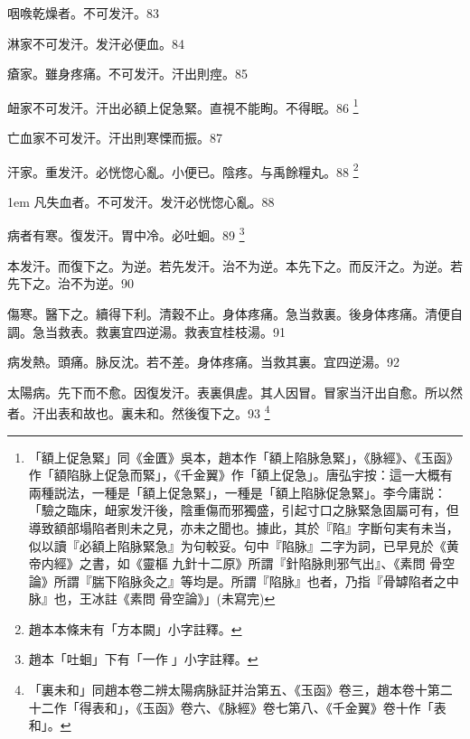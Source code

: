 咽㗋乾燥者。不可发汗。83

淋家不可发汗。发汗必便血。84

瘡家。雖身疼痛。不可发汗。汗出則痙。85

衄家不可发汗。汗出必額上促急緊。直視不能眴。不得眠。86
	\footnote{
		「額上促急緊」同《金匱》吳本，趙本作「額上陷脉急緊」，《脉經》、《玉函》作「額陷脉上促急而緊」，《千金翼》作「額上促急」。唐弘宇按：這一大概有兩種説法，一種是「額上促急緊」，一種是「額上陷脉促急緊」。李今庸説：「驗之臨床，衄家发汗後，陰重傷而邪獨盛，引起寸口之脉緊急固屬可有，但導致額部塌陷者則未之見，亦未之聞也。據此，其於『陷』字斷句実有未当，似以讀『必額上陷脉緊急』为句較妥。句中『陷脉』二字为詞，已早見於《黄帝内經》之書，如《靈樞{ }九針十二原》所謂『針陷脉則邪气出』、《素問{ }骨空論》所謂『腨下陷脉灸之』等均是。所謂『陷脉』也者，乃指『骨罅陷者之中脉』也，王冰註《素問{ }骨空論》」(未寫完)
	}

亡血家不可发汗。汗出則寒慄而振。87

汗家。重发汗。必恍惚心亂。小便已。陰疼。与禹餘糧丸。88
	\footnote{
		趙本本條末有「方本闕」小字註釋。
	}

\hangindent 1em
凡失血者。不可发汗。发汗必恍惚心亂。{\shenghui}88

病者有寒。復发汗。胃中冷。必吐蛔。89
	\footnote{
		趙本「吐蛔」下有「一作{\sungii 𠱘}」小字註釋。
	}

本发汗。而復下之。为逆。若先发汗。治不为逆。本先下之。而反汗之。为逆。若先下之。治不为逆。90

傷寒。醫下之。續得下利。清穀不止。身体疼痛。急当救裏。後身体疼痛。清便自調。急当救表。救裏宜四逆湯。救表宜桂枝湯。91

病发熱。頭痛。脉反沈。若不差。身体疼痛。当救其裏。宜四逆湯。92

太陽病。先下而不愈。因復发汗。表裏俱虗。其人因冒。冒家当汗出自愈。所以然者。汗出表和故也。裏未和。然後{\khaai 復}下之。93
	\footnote{
		「裏未和」同趙本卷二辨太陽病脉証并治第五、《玉函》卷三，趙本卷十第二十二作「得表和」，《玉函》卷六、《脉經》卷七第八、《千金翼》卷十作「表和」。
	}

